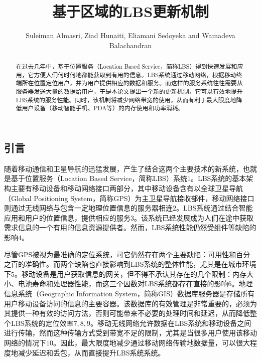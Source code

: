 \documentclass{article}
\title{基于区域的LBS更新机制}
\author{Suleiman Almasri, Ziad Hunaiti, Eliamani Sedoyeka and Wamadeva Balachandran}
\begin{document}
\begin{CJK}{UTF8}{gbsn}
  \maketitle

  \renewcommand{\abstractname}{摘要}
	\renewcommand{\figurename}{图}
	\renewcommand{\refname}{参考文献}

	

  \begin{abstract}
		在过去几年中，基于位置服务（Location Based Service，简称LBS）得到快速发展和应用，它方便人们何时何地都能获取到有用的信息。LBS系统通过移动网络，根据移动终端所在位置定位用户，并为用户提供相应的数据和服务。而这样的服务系统往往需要从服务器发送大量的数据给用户，于是本论文提出一个新的更新机制，它可以有效地提升LBS系统的服务性能。同时，该机制将减少网络带宽的使用，从而有利于最大限度地降低用户设备（移动智能手机、PDA等）的内存使用和功率消耗。
  \end{abstract}

  \newpage
  \section{引言}
	随着移动通信和卫星导航的迅猛发展，产生了结合这两个主要技术的新系统，也就是基于位置服务（Location Based Service，简称LBS）系统$1$。LBS系统的基本架构主要有移动设备和移动网络接口两部分，其中移动设备含有以全球卫星导航（Global Positioning System，简称GPS）为主卫星导航接收部件，移动网络接口则通过无线网络与包含一定地理位置信息的服务器相连$2$。LBS系统通过结合智能应用和用户的位置信息，提供相应的服务$3$。该系统已经发展成为人们在途中获取需求信息的一个有用的信息资源提供者。然而，LBS系统性能仍然受组件等缺陷的影响$4$。

	尽管GPS被视为最准确的定位系统，可它仍然存在两个主要缺陷：可用性和百分之百的准确性。而两个缺陷也直接影响到LBS系统的整体性能，尤其是在城市环境下$5$。移动设备是用户获取信息的网关，但不得不承认其存在的几个限制：内存大小、电池寿命和处理器性能，而这三个因数对LBS系统都存在直接的影响$6$。地理信息系统（Geographic Information System，简称GIS）数据库服务器是存储所有用户移动设备访问的信息的主要容器。该数据库的有效管理是非常重要的，必须为其提供一种有效的访问方法，否则可能带来不必要的处理时间和延迟，从而降低整个LBS系统的定位效率$7,8,9$。移动无线网络允许数据在LBS系统和移动设备之间进行传输，然而这种传输方式受到带宽不足的限制，尤其是当很多用户使用该移动网络的情况下$10$。因此，最大限度地减少通过移动网络传输地数据量，可以很大程度地减少延迟和丢包，从而直接提升LBS系统系统。


\end{CJK}
\end{document}
